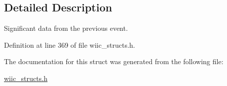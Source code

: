 \subsection{Detailed Description}
Significant data from the previous event. 

Definition at line 369 of file wiic\-\_\-structs.\-h.



The documentation for this struct was generated from the following file\-:\begin{DoxyCompactItemize}
\item 
\hyperlink{wiic__structs_8h}{wiic\-\_\-structs.\-h}\end{DoxyCompactItemize}
